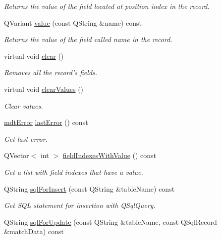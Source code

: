 \begin{DoxyCompactItemize}
\begin{DoxyCompactList}\small\item\em Returns the value of the field located at position index in the record. \end{DoxyCompactList}\item 
Q\-Variant \hyperlink{classmdt_sql_record_abfa14a89fa5e525c57d28f7f93dbcac8}{value} (const Q\-String \&name) const 
\begin{DoxyCompactList}\small\item\em Returns the value of the field called name in the record. \end{DoxyCompactList}\item 
virtual void \hyperlink{classmdt_sql_record_ad1058337837b2891d2e282001ad889d9}{clear} ()
\begin{DoxyCompactList}\small\item\em Removes all the record's fields. \end{DoxyCompactList}\item 
virtual void \hyperlink{classmdt_sql_record_a0bfc0fc265c6b0048698e2f5d4f840a8}{clear\-Values} ()
\begin{DoxyCompactList}\small\item\em Clear values. \end{DoxyCompactList}\item 
\hyperlink{classmdt_error}{mdt\-Error} \hyperlink{classmdt_sql_record_aa997bbc32402c3a254404ab74b9662f0}{last\-Error} () const 
\begin{DoxyCompactList}\small\item\em Get last error. \end{DoxyCompactList}\item 
Q\-Vector$<$ int $>$ \hyperlink{classmdt_sql_record_a7be0d16ddc4651194ab12090065b2c1e}{field\-Indexes\-With\-Value} () const 
\begin{DoxyCompactList}\small\item\em Get a list with field indexes that have a value. \end{DoxyCompactList}\item 
Q\-String \hyperlink{classmdt_sql_record_a20396c886d184d0ae176f8dea72d971b}{sql\-For\-Insert} (const Q\-String \&table\-Name) const 
\begin{DoxyCompactList}\small\item\em Get S\-Q\-L statement for insertion with Q\-Sql\-Query. \end{DoxyCompactList}\item 
Q\-String \hyperlink{classmdt_sql_record_a2ded0365b7ec9c94607bb6d8a5c16c98}{sql\-For\-Update} (const Q\-String \&table\-Name, const Q\-Sql\-Record \&match\-Data) const 

\end{DoxyCompactItemize}
